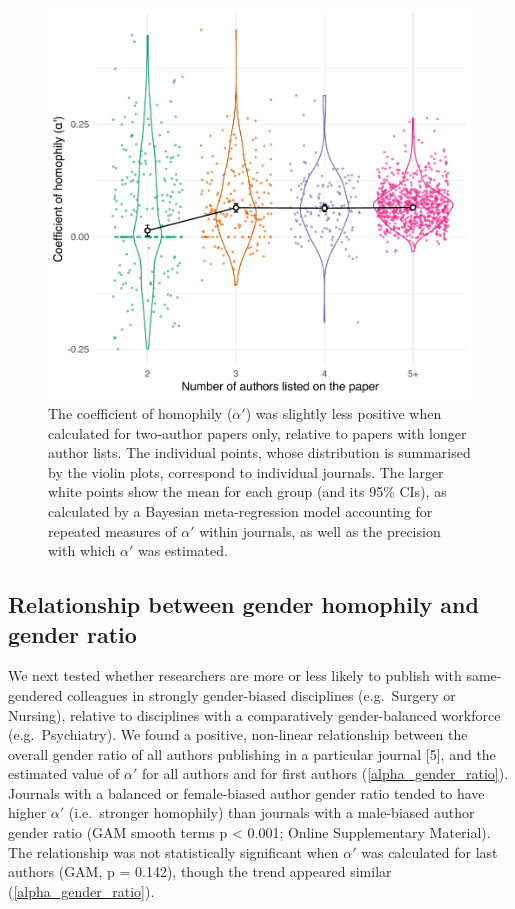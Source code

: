 \documentclass[12pt,]{article}
\begin{document}
\begin{figure}
\centering
\includegraphics{../figures/Fig3.pdf}
\caption{The coefficient of homophily (\(\alpha'\)) was slightly less
positive when calculated for two-author papers only, relative to papers
with longer author lists. The individual points, whose distribution is
summarised by the violin plots, correspond to individual journals. The
larger white points show the mean for each group (and its 95\% CIs), as
calculated by a Bayesian meta-regression model accounting for repeated
measures of \(\alpha'\) within journals, as well as the precision with
which \(\alpha'\) was estimated. \label{author_number}}
\end{figure}

\hypertarget{relationship-between-gender-homophily-and-gender-ratio}{%
\subsection{Relationship between gender homophily and gender
ratio}\label{relationship-between-gender-homophily-and-gender-ratio}}

We next tested whether researchers are more or less likely to publish
with same-gendered colleagues in strongly gender-biased disciplines
(e.g.~Surgery or Nursing), relative to disciplines with a comparatively
gender-balanced workforce (e.g.~Psychiatry). We found a positive,
non-linear relationship between the overall gender ratio of all authors
publishing in a particular journal {[}5{]}, and the estimated value of
\(\alpha'\) for all authors and for first authors
(\autoref{alpha_gender_ratio}). Journals with a balanced or
female-biased author gender ratio tended to have higher \(\alpha'\)
(i.e.~stronger homophily) than journals with a male-biased author gender
ratio (GAM smooth terms p \textless{} 0.001; Online Supplementary
Material). The relationship was not statistically significant when
\(\alpha'\) was calculated for last authors (GAM, p = 0.142), though the
trend appeared similar (\autoref{alpha_gender_ratio}).
\end{document}
